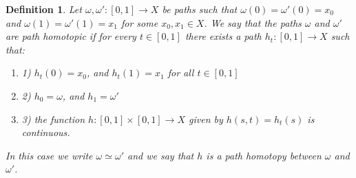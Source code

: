 \documentclass[11pt, letterpaper, oneside]{report}
\theoremstyle{pplain}
\theoremstyle{ddefinition}
\newtheorem{definition}[theorem]{Definition}
\theoremstyle{nnn}
\theoremstyle{eexercise}
\newcommand{\benu}{\begin{enumerate}}
\newcommand{\eenu}{\end{enumerate}}
\begin{document}
\begin{definition}
Let $\omega, \omega'\colon [0, 1]\to X$ be paths such that $\omega(0) = \omega'(0) = x_{0}$
and $\omega(1) = \omega'(1) = x_{1}$ for some $x_{0}, x_{1}\in X$. 
We say that the paths $\omega$ and $\omega'$ are 
\emph{path homotopic} if for every $t\in [0, 1]$ there exists a path 
$h_{t}\colon [0, 1] \to X$  such that:
\benu
\item[1)] $h_{t}(0) = x_{0}$, and $h_{t}(1) = x_{1}$ for all $t\in [0, 1]$
\item[2)] $h_{0} = \omega$,  and $h_{1} = \omega'$
\item[3)] the function $h\colon [0, 1]\times [0,1] \to X$ given by $h(s, t) = h_{t}(s)$
is continuous. 
\eenu
In this case we write $\omega \simeq \omega'$ and we say that $h$ is a
\emph{path homotopy} between $\omega$ and $\omega'$.  

\end{definition}
\end{document}
